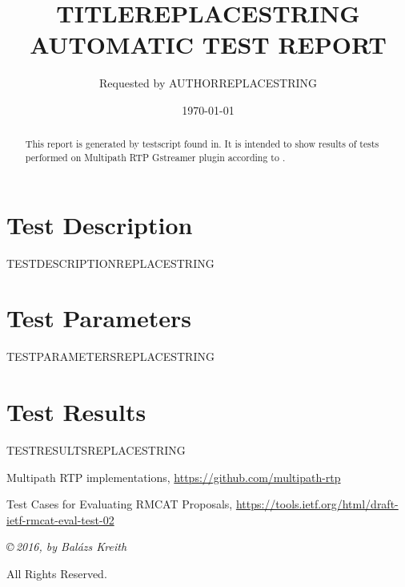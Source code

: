 \documentclass[a4paper]{article}
\title{
TITLEREPLACESTRING
\\[1cm]
\large \textbf{AUTOMATIC TEST REPORT}
\\[1cm]
}
\author{
Requested by 
AUTHORREPLACESTRING
}
\date{\today}
\begin{document}
\maketitle


\begin{abstract}
This report is generated by testscript found in\cite{mprtp_gstreamer_github}. It is intended to show results of tests performed on Multipath RTP Gstreamer plugin according to \cite{rmcat_test_draft}.
\end{abstract}

\section{Test Description}
TESTDESCRIPTIONREPLACESTRING

\section{Test Parameters}
TESTPARAMETERSREPLACESTRING

\section{Test Results}
TESTRESULTSREPLACESTRING


\begin{thebibliography}{9}
Multipath RTP implementations, \url{https://github.com/multipath-rtp}

Test Cases for Evaluating RMCAT Proposals, \url{https://tools.ietf.org/html/draft-ietf-rmcat-eval-test-02}

\end{thebibliography}

{%
   \vspace*{65mm}
   \thispagestyle{empty}
   \footnotesize\itshape
   \setlength{\parskip}{\baselineskip}
   \setlength{\parindent}{0pt}
   \copyright\,2016, by Balázs Kreith

   All Rights Reserved.
}%
\end{document}
